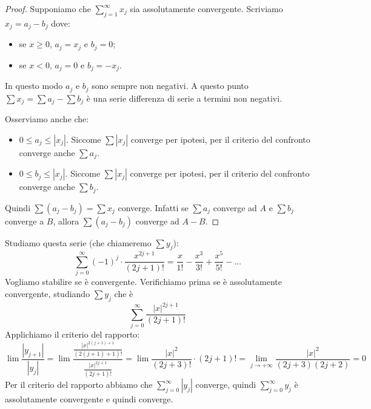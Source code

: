 \begin{proof}
Supponiamo che $\sum_{j=1}^\infty x_j$ sia assolutamente convergente. Scriviamo $x_j = a_j - b_j$ dove:
\begin{itemize}
\item se $x \ge 0$, $a_j = x_j$ e $b_j = 0$;
\item se $x < 0$, $a_j = 0$ e $b_j = -x_j$.
\end{itemize}
In questo modo $a_j$ e $b_j$ sono sempre non negativi. A questo punto $\sum x_j = \sum a_j - \sum b_j$ è una serie differenza di serie a termini non negativi.

Osserviamo anche che:
\begin{itemize}
\item $0 \le a_j \le |x_j|$. Siccome $\sum |x_j|$ converge per ipotesi, per il criterio del confronto converge anche $\sum a_j$.
\item $0 \le b_j \le |x_j|$. Siccome $\sum |x_j|$ converge per ipotesi, per il criterio del confronto converge anche $\sum b_j$.
\end{itemize}

Quindi $\sum (a_j-b_j) = \sum x_j$ converge. Infatti se $\sum a_j$ converge ad $A$ e $\sum b_j$ converge a $B$, allora $\sum (a_j - b_j)$ converge ad $A-B$.
\end{proof}

\begin{example}
Studiamo questa serie (che chiameremo $\sum y_j$):
\begin{equation*}
\sum_{j=0}^\infty (-1)^j \cdot \frac{x^{2j+1}}{(2j+1)!} = \frac{x}{1!} - \frac{x^3}{3!} + \frac{x^5}{5!} - \ldots
\end{equation*}
Vogliamo stabilire se è convergente. Verifichiamo prima se è assolutamente convergente, studiando $\sum y_j$ che è
\begin{equation*}
\sum_{j=0}^\infty \frac{|x|^{2j+1}}{(2j+1)!}
\end{equation*}
Applichiamo il criterio del rapporto:
\begin{equation*}
\lim \frac{|y_{j+1}|}{|y_j|} = \lim \frac{\frac{|x|^{2(j+1)+1}}{(2(j+1)+1)!}}{\frac{|x|^{2j+1}}{(2j+1)!}} = \lim \frac{|x|^2}{(2j+3)!} \cdot (2j+1)! = \lim_{j \to +\infty} \frac{|x|^2}{(2j+3)(2j+2)} = 0
\end{equation*}
Per il criterio del rapporto abbiamo che $\sum_{j=0}^\infty |y_j|$ converge, quindi $\sum_{j=0}^\infty y_j$ è assolutamente convergente e quindi converge.
\end{example}

